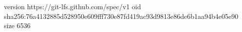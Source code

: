 version https://git-lfs.github.com/spec/v1
oid sha256:76a4132885d528950e609fff730e87fd419ac93d9813e86de6b1aa94b4e05e90
size 6536
